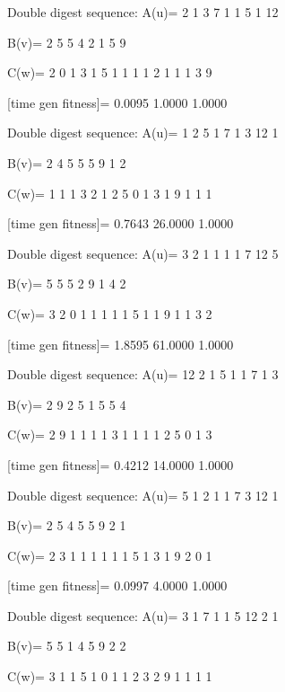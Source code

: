 Double digest sequence:
A(u)=
     2     1     3     7     1     1     5     1    12

B(v)=
     2     5     5     4     2     1     5     9

C(w)=
     2     0     1     3     1     5     1     1     1     1     2     1     1     1     3     9

[time gen fitness]=
    0.0095    1.0000    1.0000

Double digest sequence:
A(u)=
     1     2     5     1     7     1     3    12     1

B(v)=
     2     4     5     5     5     9     1     2

C(w)=
     1     1     1     3     2     1     2     5     0     1     3     1     9     1     1     1

[time gen fitness]=
    0.7643   26.0000    1.0000

Double digest sequence:
A(u)=
     3     2     1     1     1     1     7    12     5

B(v)=
     5     5     5     2     9     1     4     2

C(w)=
     3     2     0     1     1     1     1     1     5     1     1     9     1     1     3     2

[time gen fitness]=
    1.8595   61.0000    1.0000

Double digest sequence:
A(u)=
    12     2     1     5     1     1     7     1     3

B(v)=
     2     9     2     5     1     5     5     4

C(w)=
     2     9     1     1     1     1     3     1     1     1     1     2     5     0     1     3

[time gen fitness]=
    0.4212   14.0000    1.0000

Double digest sequence:
A(u)=
     5     1     2     1     1     7     3    12     1

B(v)=
     2     5     4     5     5     9     2     1

C(w)=
     2     3     1     1     1     1     1     1     5     1     3     1     9     2     0     1

[time gen fitness]=
    0.0997    4.0000    1.0000

Double digest sequence:
A(u)=
     3     1     7     1     1     5    12     2     1

B(v)=
     5     5     1     4     5     9     2     2

C(w)=
     3     1     1     5     1     0     1     1     2     3     2     9     1     1     1     1

